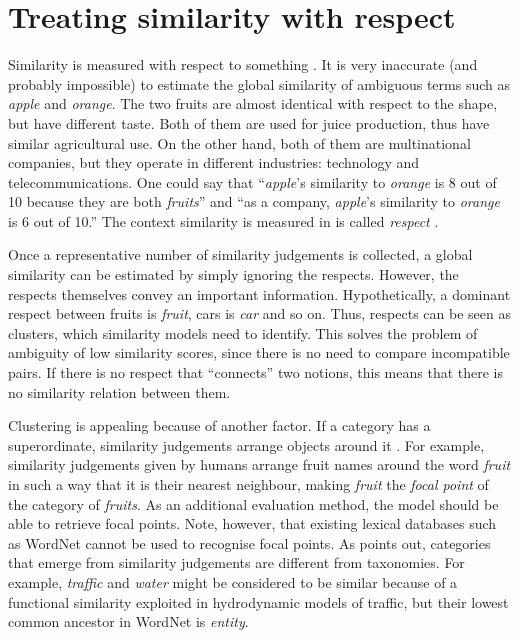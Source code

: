 \documentclass[11pt]{article}
\begin{document}

\section{Treating similarity with respect}


Similarity is measured with respect to something \cite{Roth1983346,Sadler1993}. It is very inaccurate (and probably impossible) to estimate the global similarity of ambiguous terms such as \textit{apple} and \textit{orange}. The two fruits are almost identical with respect to the shape, but have different taste. Both of them are used for juice production, thus have similar agricultural use. On the other hand, both of them are multinational companies, but they operate in different industries: technology and telecommunications. One could say that ``\textit{apple}'s similarity to \textit{orange} is 8 out of 10 because they are both \textit{fruits}'' and ``as a company, \textit{apple}'s similarity to \textit{orange} is 6 out of 10.'' The context similarity is measured in is called \emph{respect} \cite{hahn1997concepts}.

Once a representative number of similarity judgements is collected, a global similarity can be estimated by simply ignoring the respects. However, the respects themselves convey an important information. Hypothetically, a dominant respect between fruits is \textit{fruit}, cars is \textit{car} and so on. Thus, respects can be seen as clusters, which similarity models need to identify. This solves the problem of ambiguity of low similarity scores, since there is no need to compare incompatible pairs. If there is no respect that ``connects'' two notions, this means that there is no similarity relation between them.

Clustering is appealing because of another factor. If a category has a superordinate, similarity judgements arrange objects around it \cite{1986-13502-00119860101}. For example, similarity judgements given by humans arrange fruit names around the word \textit{fruit} in such a way that it is their nearest neighbour, making \textit{fruit} the \emph{focal point} of the category of \textit{fruits}. As an additional evaluation method, the model should be able to retrieve focal points. Note, however, that existing lexical databases such as WordNet \cite{Miller:1995:WLD:219717.219748} cannot be used to recognise focal points. As  points out, categories that emerge from similarity judgements are different from taxonomies. For example, \textit{traffic} and \textit{water} might be considered to be similar because of a functional similarity exploited in hydrodynamic models of traffic, but their lowest common ancestor in WordNet is \textit{entity}.
\end{document}
